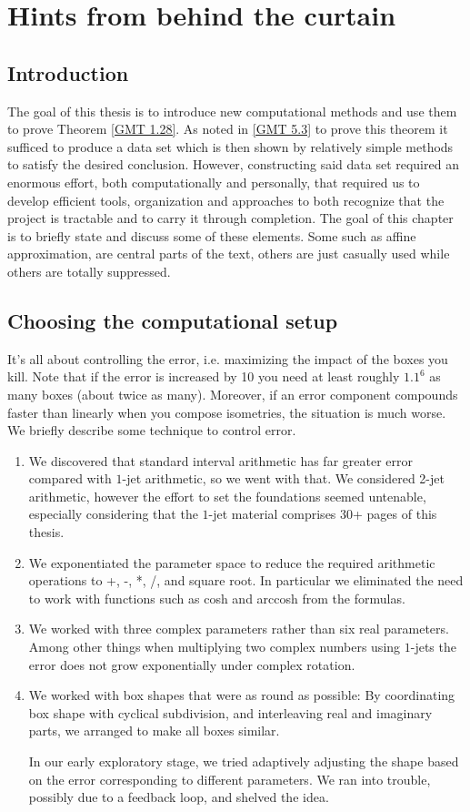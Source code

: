 \chapter{Hints from behind the curtain}\label{Ch.Crumbs}
\section{Introduction}
The goal of this thesis is
to introduce new computational methods
and use them to prove Theorem \ref{GMT 1.28}.
As noted in \ref{GMT 5.3} to prove this theorem it sufficed
to produce a data set which is then shown
by relatively simple methods to satisfy the desired conclusion.
However, constructing said data set required an enormous effort,
both computationally and personally,
that required us to develop efficient tools,
organization and approaches to both
recognize that the project is tractable
and to carry it through completion.
The goal of this chapter is to briefly state and discuss some of these elements.
Some such as affine approximation, are central parts of the text,
others are just casually used while others are totally suppressed.

\section{Choosing the computational setup}
It's all about controlling the error,
i.e.  maximizing the impact of the boxes you kill.
Note that if the error is increased by 10%
you need at least roughly $1.1^6$ as many boxes (about twice as many).
Moreover, if an error component compounds faster than linearly
when you compose isometries, the situation is much worse.
We briefly describe some technique to control error.
\begin{enumerate}
	\item We discovered that standard interval arithmetic
		has far greater error compared with $1$-jet arithmetic,
		so we went with that.
		We considered 2-jet arithmetic,
		however the effort to set the foundations
		seemed untenable,
		especially considering that the $1$-jet material
		comprises 30+ pages of this thesis.
	\item We exponentiated the parameter space
		to reduce the required arithmetic operations
		to +, -, *, /, and square root.
		In particular we eliminated the need to work
		with functions such as cosh and arccosh from the formulas.
	\item We worked with three complex parameters
		rather than six real parameters.
		Among other things when multiplying
		two complex numbers using $1$-jets
		the error does not grow exponentially under complex rotation.
	\item We worked with box shapes that were as round as possible:
		By coordinating box shape with cyclical subdivision,
		and interleaving real and imaginary parts,
		we arranged to make all boxes similar.
		
		In our early exploratory stage,
		we tried adaptively adjusting the shape based on
		the error corresponding to different parameters.
		We ran into trouble, possibly due to a feedback loop,
		and shelved the idea.
\end{enumerate}

